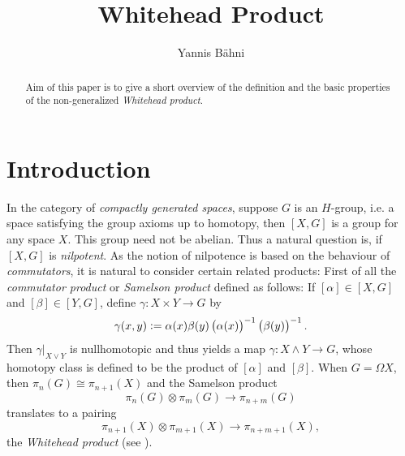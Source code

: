 

\title{Whitehead Product}
\author{Yannis B\"{a}hni}
\address[Yannis B\"{a}hni]{University of Zurich, R\"{a}mistrasse 71, 8006 Zurich}



\begin{abstract}
	Aim of this paper is to give a short overview of the definition and the basic properties of the non-generalized \emph{Whitehead product}.
\end{abstract}

\maketitle

\tableofcontents

\section{Introduction}
In the category of \emph{compactly generated spaces}, suppose $G$ is an $H$-group, i.e. a space satisfying the group axioms up to homotopy, then $[X,G]$ is a group for any space $X$. This group need not be abelian. Thus a natural question is, if $[X,G]$ is \emph{nilpotent}. As the notion of nilpotence is based on the behaviour of \emph{commutators}, it is natural to consider certain related products: First of all the \emph{commutator product} or \emph{Samelson product} defined as follows: If $[\alpha] \in [X,G]$ and $[\beta] \in [Y,G]$, define $\gamma : X \times Y \to G$ by
\begin{equation*}
	\gamma(x,y) := \alpha(x)\beta(y)\del[1]{\alpha(x)}^{-1}\del[1]{\beta(y)}^{-1}.
\end{equation*}
Then $\gamma\vert_{X \vee Y}$ is nullhomotopic and thus yields a map $\gamma : X \wedge Y \to G$, whose homotopy class is defined to be the product of $[\alpha]$ and $[\beta]$. When $G = \Omega X$, then $\pi_n(G) \cong \pi_{n + 1}(X)$ and the Samelson product
\begin{equation*}
	\pi_n(G) \otimes \pi_m(G) \to \pi_{n + m}(G)
\end{equation*}
\noindent translates to a pairing
\begin{equation*}
	\pi_{n + 1}(X) \otimes \pi_{m + 1}(X) \to \pi_{n + m + 1}(X),
\end{equation*}
\noindent the \emph{Whitehead product} (see \cite[456--457]{whitehead:homotopy_theory:1978}).

